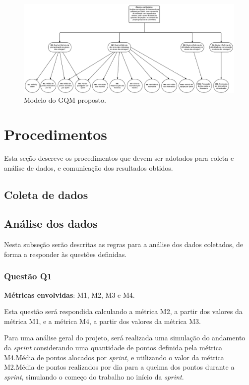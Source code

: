 	\begin{figure}[!htb]
	  \centering
	  \includegraphics[scale=0.27, angle=90]{figuras/GQM}
	  \caption[Modelo do GQM proposto.]{Modelo do GQM proposto.}
	  \label{gqm_proposto}
	\end{figure}
      
    \section{Procedimentos}
     
      Esta seção descreve os procedimentos que devem ser adotados para coleta e análise de dados, e comunicação dos resultados obtidos.
      
      \subsection{Coleta de dados}
      
      \subsection{Análise dos dados}

      	Nesta subseção serão descritas as regras para a análise dos dados coletados, de forma a responder às questões definidas.

      	\subsubsection{Questão Q1}

      		\textbf{Métricas envolvidas}: M1, M2, M3 e M4.

      		Esta questão será respondida calculando a métrica M2, a partir dos valores da métrica M1, e a métrica M4, a partir dos valores
      		da métrica M3.

      		Para uma análise geral do projeto, será realizada uma simulação do andamento da \textit{sprint} considerando uma quantidade de
      		pontos definida pela métrica M4.Média de pontos alocados por \textit{sprint}, e utilizando o valor da métrica M2.Média de pontos realizados por dia para a queima dos pontos durante a \textit{sprint}, simulando o começo do trabalho no início da \textit{sprint}.

